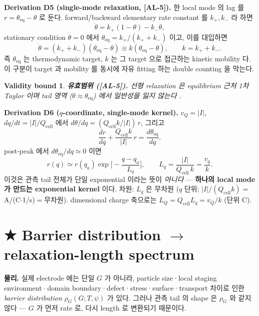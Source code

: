 \documentclass[11pt,a4paper]{article}
\newtheorem*{boundbox}{Validity bound}
\newcommand{\eq}{\mathrm{eq}}
\newcommand{\cell}{\mathrm{cell}}
\newcommand{\AL}[1]{\textsf{[AL-#1]}}
\begin{document}
\textbf{Derivation D5 (single-mode relaxation, \AL{5}).} 한 local mode 의 lag 를
$r=\theta_\eq-\theta$ 로 둔다. forward/backward elementary rate constant 를 $k_+,k_-$ 라 하면
\begin{equation}
\dot\theta=k_+(1-\theta)-k_-\theta,
\label{eq:forward_backward_flux}
\end{equation}
stationary condition $\dot\theta=0$ 에서 $\theta_\eq=k_+/(k_++k_-)$ 이고, 이를 대입하면
\begin{equation}
\dot\theta=(k_++k_-)(\theta_\eq-\theta)\equiv k(\theta_\eq-\theta),\qquad k=k_++k_-.
\label{eq:first_order_relaxation}
\end{equation}
즉 $\theta_\eq$ 는 thermodynamic target, $k$ 는 그 target 으로 접근하는 kinetic mobility 다.
이 구분이 target 과 mobility 를 동시에 자유 fitting 하는 double counting 을 막는다.
\begin{boundbox}
\textbf{유효범위 (\AL{5}).} 선형 relaxation 은 equilibrium 근처 1차 Taylor 이며 tail 영역
($\theta\approx\theta_\eq$) 에서 일반성을 잃지 않는다 \cite{degrootmazur1962,onsager1931}.
\end{boundbox}

\textbf{Derivation D6 ($q$-coordinate, single-mode kernel).} $v_Q=|I|$, $dq/dt=|I|/Q_\cell$
에서 $d\theta/dq=(Q_\cell k/|I|)\,r$, 그리고
\begin{equation}
\frac{dr}{dq}+\frac{Q_\cell k}{|I|}\,r=\frac{d\theta_\eq}{dq}.
\label{eq:r_ode}
\end{equation}
post-peak 에서 $d\theta_\eq/dq\simeq0$ 이면
\begin{equation}
\boxed{\;r(q)\simeq r(q_a)\exp\!\Big[-\frac{q-q_a}{L_q}\Big],\qquad L_q=\frac{|I|}{Q_\cell\,k}=\frac{v_q}{k}.\;}
\label{eq:single_kernel}
\end{equation}
이것은 관측 tail 전체가 단일 exponential 이라는 뜻이 \emph{아니다} — \textbf{하나의 local
mode 가 만드는 exponential kernel} 이다. 차원: $L_q$ 은 무차원 ($q$ 단위; $|I|/(Q_\cell k)=$
A/(C$\cdot$1/s)$=$무차원). dimensional charge 축으로는 $L_Q=Q_\cell L_q=v_Q/k$ (단위 C).

\section{★ Barrier distribution $\to$ relaxation-length spectrum}\label{sec:spectrum}
\textbf{물리.} 실제 electrode 에는 단일 $G$ 가 아니라, particle size·local staging
environment·domain boundary·defect·stress·surface·transport 차이로 인한 \emph{barrier
distribution} $\rho_G(G;T,\psi)$ 가 있다. 그러나 관측 tail 의 shape 은 $\rho_G$ 와 같지
않다 — $G$ 가 먼저 rate 로, 다시 length 로 변환되기 때문이다.
\end{document}
